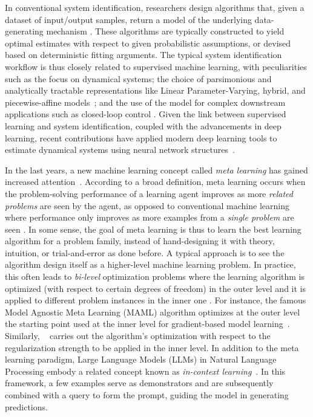 \documentclass{article}
\begin{document}
In conventional system identification, researchers design algorithms that, given a dataset of input/output samples, return a model of the underlying data-generating mechanism \cite{ljung1999system,pintelon2012system}. 
These algorithms are typically constructed to yield optimal estimates with respect to given probabilistic assumptions, or devised based on deterministic fitting arguments. 
The typical system identification workflow is thus closely related to supervised machine learning, with peculiarities such as the focus on dynamical systems; the choice of parsimonious and analytically tractable representations like Linear Parameter-Varying, hybrid, and piecewise-affine models~\cite{lovera2013lpv, breschi2016piecewise, mejari2020identification};  and the use of the model for complex downstream applications such as closed-loop control \cite{gevers2005identification, piga2019performance}. Given the link between supervised learning and system identification, coupled with the advancements in deep learning, recent contributions have applied modern deep learning tools to estimate dynamical systems using neural network structures~\cite{andersson2019deep,forgione2021dynonet,forgione2021continuous,masti2021learning,beintema2023deep}.

In the last years, a new machine learning concept called \emph{meta learning} has gained increased attention~\cite{hospedales2021meta}. 
According to a broad definition, meta learning occurs when the problem-solving performance of a learning agent improves as more \emph{related problems} are seen by the agent, as opposed to conventional machine learning where performance only improves as more examples from a \emph{single problem} are seen \cite{thrun1998learning}.
In some sense, the goal of meta learning is thus to learn the best learning algorithm for a problem family, instead of hand-designing it with theory, intuition, or trial-and-error as done before. 
A typical approach is to see the algorithm design itself as a higher-level machine learning problem. In practice, this often leads to \emph{bi-level} optimization problems where the learning algorithm is optimized (with respect to certain degrees of freedom) in the outer level and it is applied to different problem instances in the inner one \cite{franceschi2018bilevel}.
For instance, the famous Model Agnostic Meta Learning (MAML) algorithm optimizes at the outer level the starting point used at the inner level for gradient-based model learning~\cite{finn2017model}. Similarly, ~\cite{franceschi2018bilevel} carries out the algorithm's optimization with respect to the regularization strength to be applied in the inner level. In addition to the meta learning paradigm, Large Language Models (LLMs) in Natural Language Processing embody a  related concept known as \emph{in-context learning}~\cite{dong2022survey}. In this framework, a few examples serve as demonstrators and are subsequently combined with a query to form the prompt, guiding the model in generating predictions.
\end{document}
